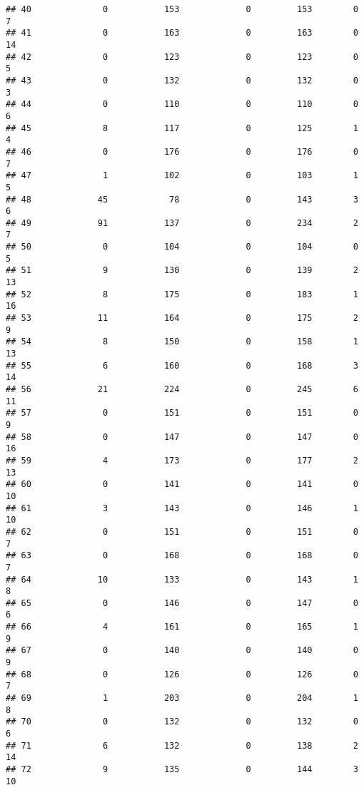 \documentclass[]{article}
\begin{document}
\begin{verbatim}
## 40              0           153             0         153        0        7
## 41              0           163             0         163        0       14
## 42              0           123             0         123        0        5
## 43              0           132             0         132        0        3
## 44              0           110             0         110        0        6
## 45              8           117             0         125        1        4
## 46              0           176             0         176        0        7
## 47              1           102             0         103        1        5
## 48             45            78             0         143        3        6
## 49             91           137             0         234        2        7
## 50              0           104             0         104        0        5
## 51              9           130             0         139        2       13
## 52              8           175             0         183        1       16
## 53             11           164             0         175        2        9
## 54              8           150             0         158        1       13
## 55              6           160             0         168        3       14
## 56             21           224             0         245        6       11
## 57              0           151             0         151        0        9
## 58              0           147             0         147        0       16
## 59              4           173             0         177        2       13
## 60              0           141             0         141        0       10
## 61              3           143             0         146        1       10
## 62              0           151             0         151        0        7
## 63              0           168             0         168        0        7
## 64             10           133             0         143        1        8
## 65              0           146             0         147        0        6
## 66              4           161             0         165        1        9
## 67              0           140             0         140        0        9
## 68              0           126             0         126        0        7
## 69              1           203             0         204        1        8
## 70              0           132             0         132        0        6
## 71              6           132             0         138        2       14
## 72              9           135             0         144        3       10

\end{verbatim}
\end{document}
